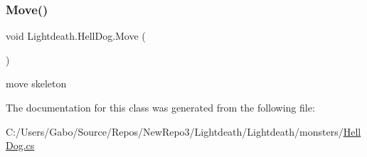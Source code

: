 \subsubsection{\texorpdfstring{Move()}{Move()}}
{\footnotesize\ttfamily void Lightdeath.\+Hell\+Dog.\+Move (\begin{DoxyParamCaption}{ }\end{DoxyParamCaption})\hspace{0.3cm}{\ttfamily [inline]}}



move skeleton 



The documentation for this class was generated from the following file\+:\begin{DoxyCompactItemize}
\item 
C\+:/\+Users/\+Gabo/\+Source/\+Repos/\+New\+Repo3/\+Lightdeath/\+Lightdeath/monsters/\hyperlink{_hell_dog_8cs}{Hell\+Dog.\+cs}\end{DoxyCompactItemize}

